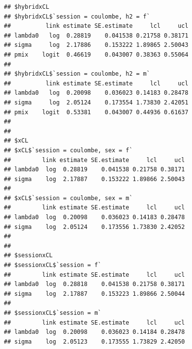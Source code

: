 \documentclass[
]{book}
\begin{document}
\begin{verbatim}
## $hybridxCL
## $hybridxCL$`session = coulombe, h2 = f`
##          link estimate SE.estimate     lcl     ucl
## lambda0   log  0.28819    0.041538 0.21758 0.38171
## sigma     log  2.17886    0.153222 1.89865 2.50043
## pmix    logit  0.46619    0.043007 0.38363 0.55064
## 
## $hybridxCL$`session = coulombe, h2 = m`
##          link estimate SE.estimate     lcl     ucl
## lambda0   log  0.20098    0.036023 0.14183 0.28478
## sigma     log  2.05124    0.173554 1.73830 2.42051
## pmix    logit  0.53381    0.043007 0.44936 0.61637
## 
## 
## $xCL
## $xCL$`session = coulombe, sex = f`
##         link estimate SE.estimate     lcl     ucl
## lambda0  log  0.28819    0.041538 0.21758 0.38171
## sigma    log  2.17887    0.153222 1.89866 2.50043
## 
## $xCL$`session = coulombe, sex = m`
##         link estimate SE.estimate     lcl     ucl
## lambda0  log  0.20098    0.036023 0.14183 0.28478
## sigma    log  2.05124    0.173556 1.73830 2.42052
## 
## 
## $sessionxCL
## $sessionxCL$`session = f`
##         link estimate SE.estimate     lcl     ucl
## lambda0  log  0.28818    0.041538 0.21758 0.38171
## sigma    log  2.17887    0.153223 1.89866 2.50044
## 
## $sessionxCL$`session = m`
##         link estimate SE.estimate     lcl     ucl
## lambda0  log  0.20098    0.036023 0.14184 0.28478
## sigma    log  2.05123    0.173555 1.73829 2.42050
\end{verbatim}
\end{document}
